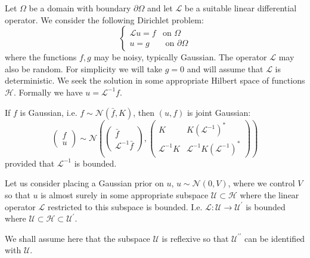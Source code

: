Let $\Omega$ be a domain with boundary $\partial\Omega$ and let $\mathcal{L}$ be a suitable linear differential operator. We consider the following Dirichlet problem:
\begin{equation}
\label{DirichletProb}
    \left\{
    \begin{array}{cc}
        \mathcal{L}u=f & \text{on } \Omega  \\
         u = g  & \text{ on } \partial\Omega
    \end{array}
    \right.
\end{equation}
where the functions $f,g$ may be noisy, typically Gaussian. The operator $\mathcal{L}$ may also be random. For simplicity we will take $g=0$ and will assume that $\mathcal{L}$ is deterministic. We seek the solution in some appropriate Hilbert space of functions $\mathcal{H}$. Formally we have $u=\mathcal{L}^{-1}f$.

\begin{remark}
If $f$ is Gaussian, i.e. $f\sim\mathcal{N}(\bar{f},K)$, then $(u,f)$ is joint Gaussian:
\begin{equation}
\label{trueJoint}
    \begin{pmatrix}
        f \\
        u
    \end{pmatrix} \sim \mathcal{N}\left(
    \begin{pmatrix}
    \bar{f} \\
    \mathcal{L}^{-1}\bar{f}
    \end{pmatrix},
    \begin{pmatrix}
    K & K(\mathcal{L}^{-1})^{*} \\
    \mathcal{L}^{-1}K & \mathcal{L}^{-1}K(\mathcal{L}^{-1})^{*}
    \end{pmatrix}
    \right)
\end{equation}
provided that $\mathcal{L}^{-1}$ is bounded.
\end{remark}

Let us consider placing a Gaussian prior on $u$, $u\sim\mathcal{N}(0,V)$, where we control $V$ so that $u$ is almost surely in some appropriate subspace $\mathcal{U}\subset\mathcal{H}$ where the linear operator $\mathcal{L}$ restricted to this subspace is bounded. I.e. $\mathcal{L}:\mathcal{U}\rightarrow \mathcal{U}^{\prime}$ is bounded where $\mathcal{U}\subset\mathcal{H}\subset\mathcal{U}^{\prime}$.
\begin{remark}
    We shall assume here that the subspace $\mathcal{U}$ is reflexive so that $\mathcal{U}^{\prime\prime}$ can be identified with $\mathcal{U}$.
\end{remark}


